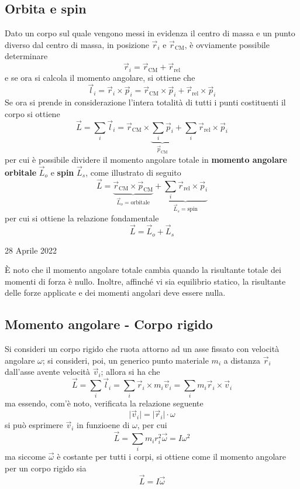 \documentclass[a4paper]{extarticle}
\begin{document}
\subsection{Orbita e spin}
Dato un corpo sul quale vengono messi in evidenza il centro di massa e un punto diverso dal centro di massa, in posizione $\vec r_i$ e $\vec r_{\text{CM}}$, è ovviamente possibile determinare
\[\vec r_i = \vec r_{\text{CM}} + \vec r_{\text{rel}}\]
e se ora si calcola il momento angolare, si ottiene che
\[\vec l_i = \vec r_i \times \vec p_i = \vec r_{\text{CM}} \times \vec p_i + \vec r_{\text{rel}} \times \vec p_i\]
Se ora si prende in considerazione l'intera totalità di tutti i punti costituenti il corpo si ottiene
\[\vec L = \sum_i \vec l_i = \vec r_{\text{CM}} \times \underbrace{\sum_i \vec p_i}_{\vec p_{\text{CM}}} + \sum_i \vec r_{\text{rel}} \times \vec p_i\]
per cui è possibile dividere il momento angolare totale in \textbf{momento angolare orbitale} $\vec L_o$ e \textbf{spin} $\vec L_s$, come illustrato di seguito
\[\vec L = \underbrace{\vec r_{\text{CM}} \times \vec p_{\text{CM}}}_{\vec L_o = \text{orbitale}} + \underbrace{\sum_{i} \vec r_{\text{rel}} \times \vec p_i}_{\vec L_s = \text{spin}}\]
per cui si ottiene la relazione fondamentale
\[\boxed{\vec L = \vec L_o + \vec L_s}\]

\newpage
\noindent
\begin{center}
  28 Aprile 2022
\end{center}
È noto che il momento angolare totale cambia quando la risultante totale dei momenti di forza è nullo. Inoltre, affinché vi sia equilibrio statico, la risultante delle forze applicate e dei momenti angolari deve essere nulla.

\vspace{1em}
\subsection{Momento angolare - Corpo rigido}
Si consideri un corpo rigido che ruota attorno ad un asse fissato con velocità angolare $\omega$; si consideri, poi, un generico punto materiale $m_i$ a distanza $\vec r_i$ dall'asse avente velocità $\vec v_i$; allora si ha che
\[\vec L = \sum_i \vec l_i = \sum_i \vec r_i \times m_i \vec v_i = \sum_i m_i \vec r_i \times \vec v_i\]
ma essendo, com'è noto, verificata la relazione seguente
\[\vert \vec v_i \vert = \vert \vec r_i \vert \cdot \omega\]
si può esprimere $\vec v_i$ in funzioene di $\omega$, per cui
\[\vec L = \sum_i m_i r_i^2 \vec \omega = I \omega^2\]
ma siccome $\vec \omega$ è costante per tutti i corpi, si ottiene come il momento angolare per un corpo rigido sia
\[\boxed{\vec L = I \vec \omega}\]
\end{document}
